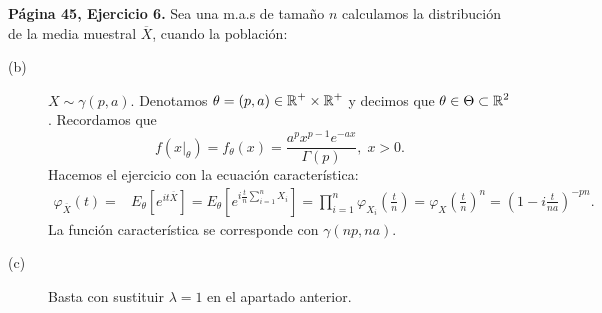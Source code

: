 \begin{eg}
\textbf{Página 45, Ejercicio 6.} Sea una m.a.s de tamaño $\displaystyle n $ calculamos la distribución de la media muestral $\displaystyle \overline{X} $, cuando la población:
\begin{description}
\item[(b)] $\displaystyle X \sim \gamma\left(p,a\right) $. Denotamos $\displaystyle \theta = \left(p,a\right) \in \mathbb{R}^{+}\times \mathbb{R}^{+} $ y decimos que $\displaystyle \theta \in \Theta \subset \mathbb{R}^{2} $. Recordamos que 
	\[f\left(x|_{\theta}\right) = f_{\theta}\left(x\right)=\frac{a^{p}x^{p-1}e^{-ax}}{\Gamma\left(p\right)}, \; x > 0 .\]
	Hacemos el ejercicio con la ecuación característica:
	\[
	\begin{split}
		\varphi_{\overline{X}}\left(t\right) = & E_{\theta}\left[e^{it\overline{X}}\right] = E_{\theta}\left[e^{i\frac{t}{n}\sum^{n}_{i = 1}X_{i}}\right] = \prod^{n}_{i = 1}\varphi_{X_{i}}\left(\frac{t}{n}\right) = \varphi_{X}\left(\frac{t}{n}\right)^{n} = \left(1 - i\frac{t}{na}\right)^{-pn} .
	\end{split}
	\]
La función característica se corresponde con $\displaystyle \gamma\left(np, na\right) $.	
\item[(c)] Basta con sustituir $\displaystyle \lambda = 1 $ en el apartado anterior.
\end{description}
\end{eg}

